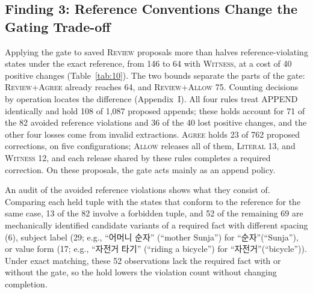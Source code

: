 \documentclass[acmsmall,review]{acmart}
\newcommand{\agree}{\textsc{Agree}}
\newcommand{\allow}{\textsc{Allow}}
\newcommand{\literal}{\textsc{Literal}}
\newcommand{\witness}{\textsc{Witness}}
\newcommand{\review}{\textsc{Review}}
\begin{document}
\subsection{Finding 3: Reference Conventions Change the Gating Trade-off}\label{sec:reference-results}
Applying the gate to saved \review{} proposals more than halves reference-violating states under the exact reference, from 146 to 64 with \witness{}, at a cost of 40 positive changes (Table~\ref{tab:10}). The two bounds separate the parts of the gate: \review{}+\agree{} already reaches 64, and \review{}+\allow{} 75. Counting decisions by operation locates the difference (Appendix~I). All four rules treat APPEND identically and hold 108 of 1,087 proposed appends; these holds account for 71 of the 82 avoided reference violations and 36 of the 40 lost positive changes, and the other four losses come from invalid extractions. \agree{} holds 23 of 762 proposed corrections, on five configurations; \allow{} releases all of them, \literal{} 13, and \witness{} 12, and each release shared by these rules completes a required correction. On these proposals, the gate acts mainly as an append policy.

An audit of the avoided reference violations shows what they consist of. Comparing each held tuple with the states that conform to the reference for the same case, 13 of the 82 involve a forbidden tuple, and 52 of the remaining 69 are mechanically identified candidate variants of a required fact with different spacing (6), subject label (29; e.g., ``어머니 순자'' (``mother Sunja'') for ``순자''(``Sunja''), or value form (17; e.g., ``자전거 타기'' (``riding a bicycle'') for ``자전거''(``bicycle'')). Under exact matching, these 52 observations lack the required fact with or without the gate, so the hold lowers the violation count without changing completion.
\end{document}
